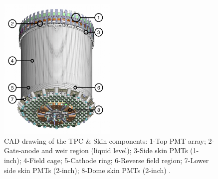 \begin{figure}[!ht]
     \centering
     \includegraphics[width=0.5\textwidth]{figures/LZ/CAD_TPC.jpg}
     \caption{CAD drawing of the TPC \& Skin components: 1-Top PMT array; 2-Gate-anode and weir region (liquid level); 3-Side skin PMTs (1-inch); 4-Field cage; 5-Cathode ring; 6-Reverse field region; 7-Lower side skin PMTs (2-inch); 8-Dome skin PMTs (2-inch) \cite{LZNIMA}.}
     \label{fig:LZ/CAD_TPC}
\end{figure}

